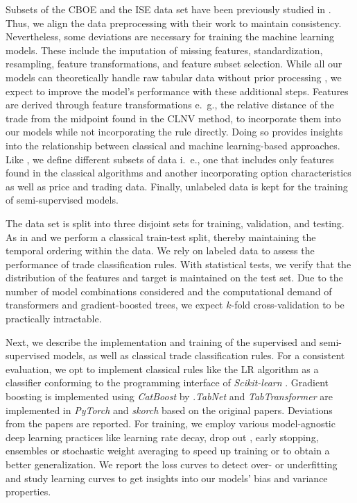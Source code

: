 Subsets of the \gls{CBOE} and the \gls{ISE} data set have been previously studied in \textcite{grauerOptionTradeClassification2022}. Thus, we align the data preprocessing with their work to maintain consistency. Nevertheless, some deviations are necessary for training the machine learning models. These include the imputation of missing features, standardization, resampling, feature transformations, and feature subset selection. While all our models can theoretically handle raw tabular data without prior processing \autocites{arikTabNetAttentiveInterpretable2020}{prokhorenkovaCatBoostUnbiasedBoosting2018}{huangTabTransformerTabularData2020}, we expect to improve the model's performance with these additional steps. Features are derived through feature transformations e.~g., the relative distance of the trade from the midpoint found in the \gls{CLNV} method, to incorporate them into our models while not incorporating the rule directly. Doing so provides insights into the relationship between classical and machine learning-based approaches. Like \textcite{ronenMachineLearningTrade2022}, we define different subsets of data i.~e., one that includes only features found in the classical algorithms and another incorporating option characteristics as well as price and trading data. Finally, unlabeled data is kept for the training of semi-supervised models.

The data set is split into three disjoint sets for training, validation, and testing. As in \textcite{ellisAccuracyTradeClassification2000} and \textcite{ronenMachineLearningTrade2022} we perform a classical train-test split, thereby maintaining the temporal ordering within the data. We rely on labeled data to assess the performance of trade classification rules. With statistical tests, we verify that the distribution of the features and target is maintained on the test set. Due to the number of model combinations considered and the computational demand of transformers and gradient-boosted trees, we expect $k$-fold cross-validation to be practically intractable.

Next, we describe the implementation and training of the supervised and semi-supervised models, as well as classical trade classification rules. 
For a consistent evaluation, we opt to implement classical rules like the \gls{LR} algorithm as a classifier conforming to the programming interface of \emph{Scikit-learn} \autocite{pedregosaScikitlearnMachineLearning2018}.
Gradient boosting is implemented using \emph{CatBoost} by \textcite{prokhorenkovaCatBoostUnbiasedBoosting2018}.\emph{TabNet} and \emph{TabTransformer} are implemented in \emph{PyTorch} \autocite{paszkePyTorchImperativeStyle2019} and \emph{skorch} based on the original papers. Deviations from the papers are reported.
For training, we employ various model-agnostic deep learning practices like learning rate decay, drop out \autocite{hintonImprovingNeuralNetworks2012}, early stopping, ensembles \autocite{huangSnapshotEnsemblesTrain2017} or stochastic weight averaging \autocite{izmailovAveragingWeightsLeads2019} to speed up training or to obtain a better generalization. We report the loss curves to detect over- or underfitting and study learning curves to get insights into our models' bias and variance properties.  

